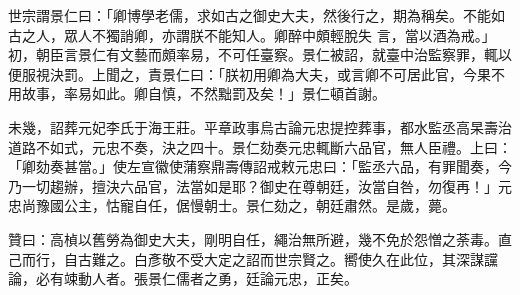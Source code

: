 \begin{pinyinscope}
 世宗謂景仁曰：「卿博學老儒，求如古之御史大夫，然後行之，期為稱矣。不能如古之人，眾人不獨誚卿，亦謂朕不能知人。卿醉中頗輕脫失
 言，當以酒為戒。」初，朝臣言景仁有文藝而頗率易，不可任臺察。景仁被詔，就臺中治監察罪，輒以便服視決罰。上聞之，責景仁曰：「朕初用卿為大夫，或言卿不可居此官，今果不用故事，率易如此。卿自慎，不然黜罰及矣！」景仁頓首謝。



 未幾，詔葬元妃李氏于海王莊。平章政事烏古論元忠提控葬事，都水監丞高杲壽治道路不如式，元忠不奏，決之四十。景仁劾奏元忠輒斷六品官，無人臣禮。上曰：「卿劾奏甚當。」使左宣徽使蒲察鼎壽傳詔戒敕元忠曰：「監丞六品，有罪聞奏，今乃一切趨辦，擅決六品官，法當如是耶？御史在尊朝廷，汝當自咎，勿復再！」元
 忠尚豫國公主，怙寵自任，倨慢朝士。景仁劾之，朝廷肅然。是歲，薨。



 贊曰：高楨以舊勞為御史大夫，剛明自任，繩治無所避，幾不免於怨憎之荼毒。直己而行，自古難之。白彥敬不受大定之詔而世宗賢之。嚮使久在此位，其深謀讜論，必有竦動人者。張景仁儒者之勇，廷論元忠，正矣。



\end{pinyinscope}